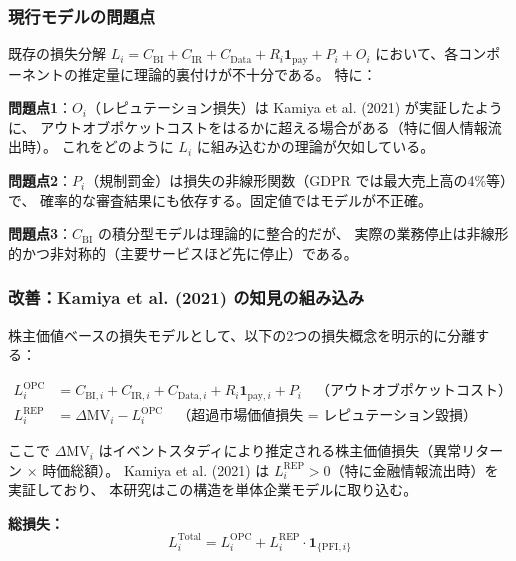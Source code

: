 \documentclass[a4paper,11pt]{article}
\newcommand{\ind}{\mathbf{1}}
\theoremstyle{definition}
\begin{document}
\subsubsection{現行モデルの問題点}

既存の損失分解 $L_i = C_{\mathrm{BI}} + C_{\mathrm{IR}} + C_{\mathrm{Data}} + R_i\ind_{\mathrm{pay}} + P_i + O_i$
において、各コンポーネントの推定量に理論的裏付けが不十分である。
特に：

\begin{tcolorbox}[warningbox]
  \textbf{問題点1}：$O_i$（レピュテーション損失）は Kamiya et al. (2021) が実証したように、
  アウトオブポケットコストをはるかに超える場合がある（特に個人情報流出時）。
  これをどのように $L_i$ に組み込むかの理論が欠如している。

  \textbf{問題点2}：$P_i$（規制罰金）は損失の非線形関数（GDPR では最大売上高の4\%等）で、
  確率的な審査結果にも依存する。固定値ではモデルが不正確。

  \textbf{問題点3}：$C_{\mathrm{BI}}$ の積分型モデルは理論的に整合的だが、
  実際の業務停止は非線形的かつ非対称的（主要サービスほど先に停止）である。
\end{tcolorbox}

\subsubsection{改善：Kamiya et al. (2021) の知見の組み込み}

株主価値ベースの損失モデルとして、以下の2つの損失概念を明示的に分離する：

\begin{align}
  L_i^{\mathrm{OPC}} &= C_{\mathrm{BI},i} + C_{\mathrm{IR},i} + C_{\mathrm{Data},i}
                        + R_i\ind_{\mathrm{pay},i} + P_i
  \quad \text{（アウトオブポケットコスト）} \\
  L_i^{\mathrm{REP}} &= \Delta\mathrm{MV}_i - L_i^{\mathrm{OPC}}
  \quad \text{（超過市場価値損失 = レピュテーション毀損）}
\end{align}

ここで $\Delta\mathrm{MV}_i$ はイベントスタディにより推定される株主価値損失（異常リターン × 時価総額）。
Kamiya et al. (2021) は $L_i^{\mathrm{REP}} > 0$（特に金融情報流出時）を実証しており、
本研究はこの構造を単体企業モデルに取り込む。

\textbf{総損失：}
\begin{equation}
  L_i^{\mathrm{Total}} = L_i^{\mathrm{OPC}} + L_i^{\mathrm{REP}} \cdot \ind_{\{\mathrm{PFI},i\}}
  \label{eq:total_loss}
\end{equation}
\end{document}
